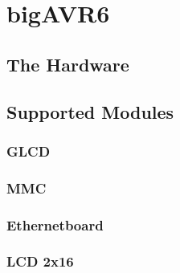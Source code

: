 
\chapter{bigAVR6} \label{chapter:bigAVR6}


\section{The Hardware}

\section{Supported Modules}

\subsection{GLCD}

\subsection{MMC}

\subsection{Ethernetboard}

\subsection{LCD 2x16}



